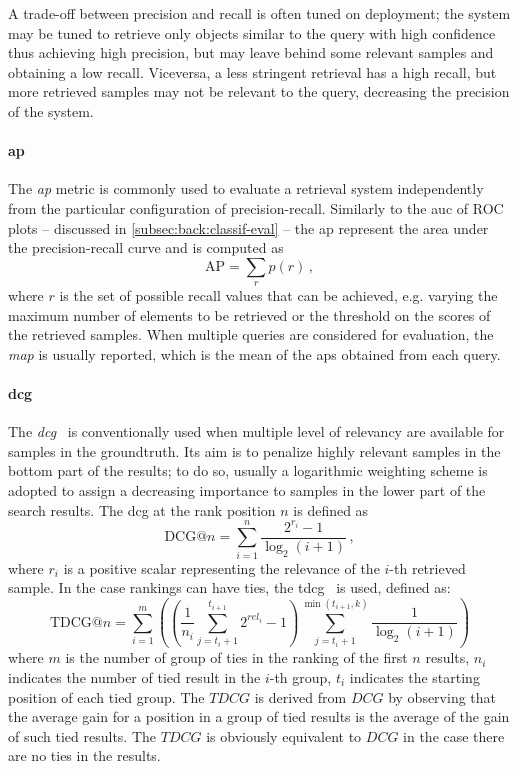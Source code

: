 A trade-off between precision and recall is often tuned on deployment;
the system may be tuned to retrieve only objects similar to the query with high confidence thus achieving high precision, but may leave behind some relevant samples and obtaining a low recall.
Viceversa, a less stringent retrieval has a high recall, but more retrieved samples may not be relevant to the query, decreasing the precision of the system.

\paragraph{\acrlong{ap}}
The \emph{\acrfull{ap}} metric is commonly used to evaluate a retrieval system independently from the particular configuration of precision-recall.
Similarly to the \acrfull{auc} of ROC plots -- discussed in \ref{subsec:back:classif-eval} -- the \gls{ap} represent the area under the precision-recall curve and is computed as
\begin{equation} \label{eq:back:ap}
    \mathrm{AP} = \sum_r p(r)\,,
\end{equation}
where $r$ is the set of possible recall values that can be achieved, e.g. varying the maximum number of elements to be retrieved or the threshold on the scores of the retrieved samples.
When multiple queries are considered for evaluation, the \emph{\acrfull{map}} is usually reported, which is the mean of the \glspl{ap} obtained from each query.

\paragraph{\acrlong{dcg}}
The \emph{\acrfull{dcg}}~\cite{jarvelin2002cumulated} is conventionally used when multiple level of relevancy are available for samples in the groundtruth.
Its aim is to penalize highly relevant samples in the bottom part of the results;
to do so, usually a logarithmic weighting scheme is adopted to assign a decreasing importance to samples in the lower part of the search results.
The \gls{dcg} at the rank position $n$ is defined as
\begin{equation} \label{eq:back:dcg}
    \mathrm{DCG}@n = \sum_{i=1}^n \frac{2^{r_i} - 1}{\log_2(i + 1)} \,,
\end{equation}
where $r_i$ is a positive scalar representing the relevance of the $i$-th retrieved sample.
In the case rankings can have ties, the \gls{tdcg}~\cite{mcsherry2008computing} is used, defined as:
%
\begin{equation}
\mathrm{TDCG}@n = \sum_{i=1}^{m}\left(\left(\frac{1}{n_i}\sum_{j=t_i+1}^{t_{i+1}}2^{rel_i}-1\right)\sum_{j=t_i+1}^{\min(t_{i+1},k)}\frac{1}{\log_2(i+1)}\right)
\end{equation}
%
where $m$ is the number of group of ties in the ranking of the first $n$ results, $n_i$ indicates the number of tied result in the $i$-th group, $t_i$ indicates the starting position of each tied group.
The $TDCG$ is derived from $DCG$ by observing that the average gain for a position in a group of tied results is the average of the gain of such tied results.
The $TDCG$ is obviously equivalent to $DCG$ in the case there are no ties in the results.


